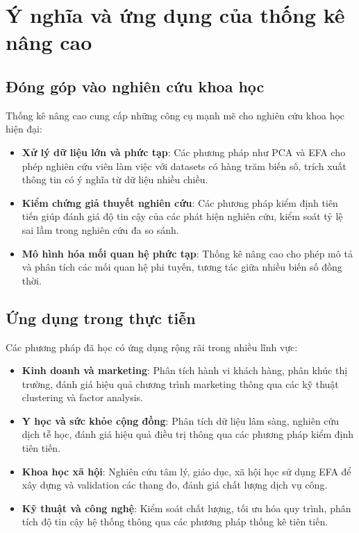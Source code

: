 \section*{Ý nghĩa và ứng dụng của thống kê nâng cao}

\subsection*{Đóng góp vào nghiên cứu khoa học}

Thống kê nâng cao cung cấp những công cụ mạnh mẽ cho nghiên cứu khoa học hiện đại:

\begin{itemize}
    \item \textbf{Xử lý dữ liệu lớn và phức tạp}: Các phương pháp như PCA và EFA cho phép nghiên cứu viên làm việc với datasets có hàng trăm biến số, trích xuất thông tin có ý nghĩa từ dữ liệu nhiều chiều.
    
    \item \textbf{Kiểm chứng giả thuyết nghiên cứu}: Các phương pháp kiểm định tiên tiến giúp đánh giá độ tin cậy của các phát hiện nghiên cứu, kiểm soát tỷ lệ sai lầm trong nghiên cứu đa so sánh.
    
    \item \textbf{Mô hình hóa mối quan hệ phức tạp}: Thống kê nâng cao cho phép mô tả và phân tích các mối quan hệ phi tuyến, tương tác giữa nhiều biến số đồng thời.
\end{itemize}

\subsection*{Ứng dụng trong thực tiễn}

Các phương pháp đã học có ứng dụng rộng rãi trong nhiều lĩnh vực:

\begin{itemize}
    \item \textbf{Kinh doanh và marketing}: Phân tích hành vi khách hàng, phân khúc thị trường, đánh giá hiệu quả chương trình marketing thông qua các kỹ thuật clustering và factor analysis.
    
    \item \textbf{Y học và sức khỏe cộng đồng}: Phân tích dữ liệu lâm sàng, nghiên cứu dịch tễ học, đánh giá hiệu quả điều trị thông qua các phương pháp kiểm định tiên tiến.
    
    \item \textbf{Khoa học xã hội}: Nghiên cứu tâm lý, giáo dục, xã hội học sử dụng EFA để xây dựng và validation các thang đo, đánh giá chất lượng dịch vụ công.
    
    \item \textbf{Kỹ thuật và công nghệ}: Kiểm soát chất lượng, tối ưu hóa quy trình, phân tích độ tin cậy hệ thống thông qua các phương pháp thống kê tiên tiến.
\end{itemize}

